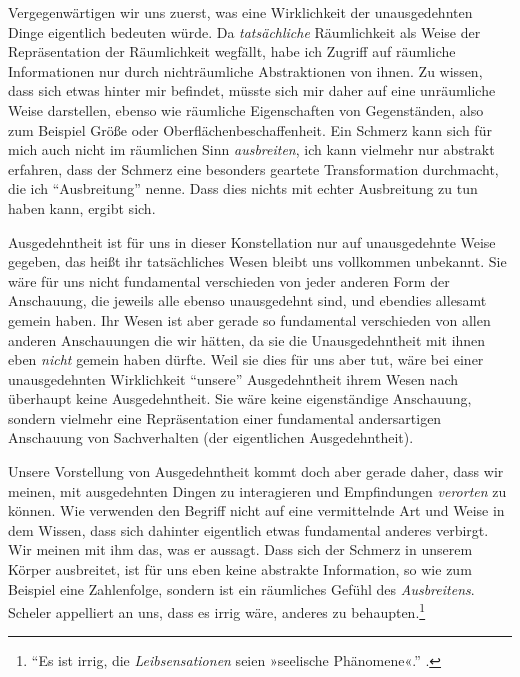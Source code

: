 \documentclass[a4paper, 12pt]{article}
\begin{document}
\begin{onehalfspace}

Vergegenwärtigen wir uns zuerst, was eine Wirklichkeit der unausgedehnten Dinge eigentlich bedeuten würde. Da \emph{tatsächliche} Räumlichkeit als Weise der Repräsentation der Räumlichkeit wegfällt, habe ich Zugriff auf räumliche Informationen nur durch nichträumliche Abstraktionen von ihnen. Zu wissen, dass sich etwas hinter mir befindet, müsste sich mir daher auf eine unräumliche Weise darstellen, ebenso wie räumliche Eigenschaften von Gegenständen, also zum Beispiel Größe oder Oberflächenbeschaffenheit. Ein Schmerz kann sich für mich auch nicht im räumlichen Sinn \emph{ausbreiten}, ich kann vielmehr nur abstrakt erfahren, dass der Schmerz eine besonders geartete Transformation durchmacht, die ich "`Ausbreitung"' nenne. Dass dies nichts mit echter Ausbreitung zu tun haben kann, ergibt sich.

Ausgedehntheit ist für uns in dieser Konstellation nur auf unausgedehnte Weise gegeben, das heißt ihr tatsächliches Wesen bleibt uns vollkommen unbekannt. Sie wäre für uns nicht fundamental verschieden von jeder anderen Form der Anschauung, die jeweils alle ebenso unausgedehnt sind, und ebendies allesamt gemein haben. Ihr Wesen ist aber gerade so fundamental verschieden von allen anderen Anschauungen die wir hätten, da sie die Unausgedehntheit mit ihnen eben \emph{nicht} gemein haben dürfte. Weil sie dies für uns aber tut, wäre bei einer unausgedehnten Wirklichkeit "`unsere"' Ausgedehntheit ihrem Wesen nach überhaupt keine Ausgedehntheit. Sie wäre keine eigenständige Anschauung, sondern vielmehr eine Repräsentation einer fundamental andersartigen Anschauung von Sachverhalten (der eigentlichen Ausgedehntheit).

Unsere Vorstellung von Ausgedehntheit kommt doch aber gerade daher, dass wir meinen, mit ausgedehnten Dingen zu interagieren und Empfindungen \emph{verorten} zu können. Wie verwenden den Begriff nicht auf eine vermittelnde Art und Weise in dem Wissen, dass sich dahinter eigentlich etwas fundamental anderes verbirgt. Wir meinen mit ihm das, was er aussagt. Dass sich der Schmerz in unserem Körper ausbreitet, ist für uns eben keine abstrakte Information, so wie zum Beispiel eine Zahlenfolge, sondern ist ein räumliches Gefühl des \emph{Ausbreitens}. Scheler appelliert an uns, dass es irrig wäre, anderes zu behaupten.\footnote{"`Es ist irrig, die \emph{Leibsensationen} seien »seelische Phänomene«."' .} 



\end{onehalfspace}
\end{document}
